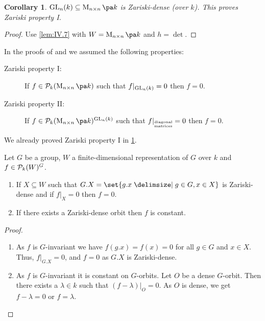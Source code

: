 \documentclass[12pt,a4paper]{scrartcl}
\theoremstyle{cplain}
\newtheorem{cor}[thmcounter]{Corollary}
\theoremstyle{cplain}
\theoremstyle{cplain}
\theoremstyle{definition}
\begin{document}
\begin{otherlanguage}{english}
\begin{cor} \label{cor:IV.8}
  $\GL_n(k) \subseteq \Mat nk$ is Zariski-dense (over $k$). This proves Zariski property I.
\end{cor}
\begin{proof}
  Use \cref{lem:IV.7} with $W = \Mat nk$ and $h= \det$.
\end{proof}


In the proofs of  and  we assumed the following properties:
\begin{description}
  \item[Zariski property I:] If $f\in\Ps_k(\Mat nk)$ such that $f|_{\operatorname{GL}_n(k)} = 0$ then $f=0$.
  \item[Zariski property II:] If $f\in\Ps_k(\Mat nk)^{\GL_n(k)}$ such that $f|_{\substack{\text{\tiny diagonal}\\\text{\tiny matrices}}} = 0$ then $f=0$.
\end{description}

We already proved Zariski property I in \cref{cor:IV.8}.

\begin{lem} \label{lem:IV.9}
  Let $G$ be a group, $W$ a finite-dimensional representation of $G$ over $k$ and $f\in\mathcal{P}_k(W)^G$.
  \begin{enumerate}
    \item If $X\subseteq W$ such that $G.X = \set{g.x \given g\in G,x \in X}$ is Zariski-dense and if $f|_X = 0$ then $f=0$. \label{lem:IV.9:1}
    \item If there exists a Zariski-dense orbit then $f$ is constant. \label{lem:IV.9:2}
  \end{enumerate}
\end{lem}
\begin{proof}
  \leavevmode
  \begin{enumerate}[label=\ref{lem:IV.9:\arabic*}]
    \item As $f$ is $G$-invariant we have $f(g.x) = f(x) = 0$ for all $g\in G$ and $x\in X$. Thus, $f|_{G.X} = 0$, and $f=0$ as $G.X$ is Zariski-dense.
    \item As $f$ is $G$-invariant it is constant on $G$-orbits. Let $O$ be a dense $G$-orbit. Then there exists a $\lambda\in k$ such that $(f-\lambda)|_O = 0$. As $O$ is dense, we get $f-\lambda = 0$ or $f=\lambda$.
    \qedhere
  \end{enumerate}
\end{proof}


\end{otherlanguage}
\end{document}
